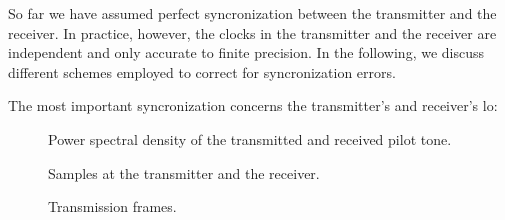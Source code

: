 So far we have assumed perfect syncronization between the transmitter and the receiver.
In practice, however, the clocks in the transmitter and the receiver are independent and only accurate to finite precision.
In the following, we discuss different schemes employed to correct for syncronization errors.

The most important syncronization concerns the transmitter's and receiver's \gls{lo}:
\begin{figure}[htb]
	\centering
	
	\caption{Power spectral density of the transmitted and received pilot tone.}
\end{figure}
\begin{figure}[htb]
	\centering
	
	\caption{Samples at the transmitter and the receiver.}
\end{figure}

\begin{figure}[htb]
	\centering
	
	\caption{Transmission frames.}
\end{figure}
